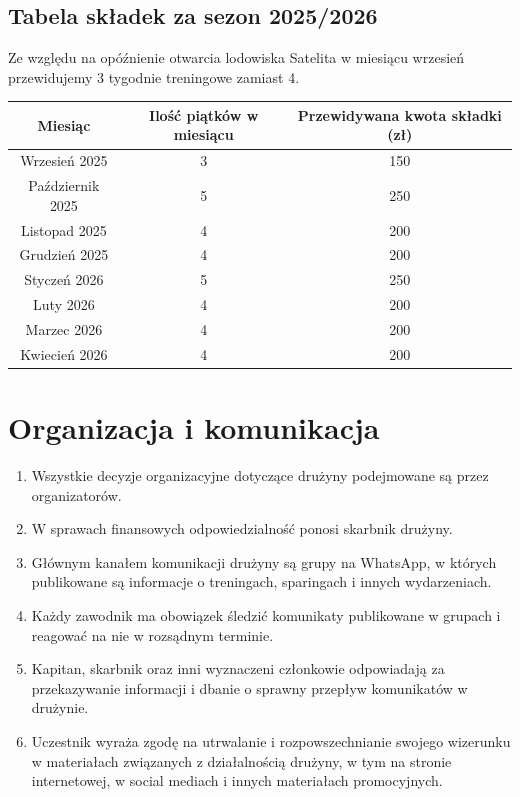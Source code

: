 \documentclass[12pt,a4paper]{article}
\let\stdsection\section
\renewcommand\section{\clearpage\stdsection}
\begin{document}
\subsection{Tabela składek za sezon 2025/2026}
Ze względu na opóźnienie otwarcia lodowiska Satelita w miesiącu wrzesień przewidujemy 3 tygodnie treningowe zamiast 4.
\begin{center}
\begin{tabular}{ |c|c|c| } 
 \hline
 Miesiąc & Ilość piątków w miesiącu & Przewidywana kwota składki (zł) \\ 
 \hline
 Wrzesień 2025 & 3 & 150 \\ 
 Październik 2025 & 5 & 250 \\ 
 Listopad 2025 & 4 & 200 \\ 
 Grudzień 2025 & 4 & 200 \\ 
 Styczeń 2026 & 5 & 250 \\ 
 Luty 2026 & 4 & 200 \\ 
 Marzec 2026 & 4 & 200 \\ 
 Kwiecień 2026 & 4 & 200 \\ 
\hline
\end{tabular}
\end{center}

\section{Organizacja i komunikacja}
\begin{enumerate}
  \item Wszystkie decyzje organizacyjne dotyczące drużyny podejmowane są przez organizatorów.
  \item W sprawach finansowych odpowiedzialność ponosi skarbnik drużyny.
  \item Głównym kanałem komunikacji drużyny są grupy na WhatsApp, w których publikowane są informacje o treningach, sparingach i innych wydarzeniach.
  \item Każdy zawodnik ma obowiązek śledzić komunikaty publikowane w grupach i reagować na nie w rozsądnym terminie.
  \item Kapitan, skarbnik oraz inni wyznaczeni członkowie odpowiadają za przekazywanie informacji i dbanie o sprawny przepływ komunikatów w drużynie.
  \item Uczestnik wyraża zgodę na utrwalanie i rozpowszechnianie swojego wizerunku w materiałach związanych z działalnością drużyny, w tym na stronie internetowej, w social mediach i innych materiałach promocyjnych.
\end{enumerate}
\end{document}
